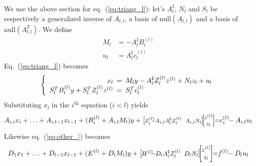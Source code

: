 \documentclass[]{article}
\theoremstyle{definition}
\newcommand{\BIN}{\begin{bmatrix}}
\newcommand{\BOUT}{\end{bmatrix}}
\begin{document}
We use the above section for eq.~(\ref{eq:triang_l}): let's $A_l^\sharp$, $N_l$ and $S_l$ be respectively a generalized inverse of $A_{l,l}$, a basis of $\mathrm{null}(A_{l,l})$ and a basis of $\mathrm{null}(A_{l,l}^T)$.
We define
\begin{align*}
	M_l &= -A_l^\sharp B_l^{(l)}\\
	u_l &= A_l^\sharp c_l^{(l)}
\end{align*}
Eq.~(\ref{eq:triang_l}) becomes
\begin{equation}
	\left\{ \begin{array}{rcl}
	x_l \hspace{-5pt}&=&\hspace{-5pt} M_l y -A_l^\sharp Z_l^{(l)} z^{(l)} + N_l z_l + u_l \\
	S_l^T B_l^{(l)} y + S_l^T Z_l^{(l)} z^{(l)} \hspace{-5pt}&=&\hspace{-5pt} S_l^T c_l^{(l)}
	\end{array}\right.
\end{equation}
Substituting $x_l$ in the $i^{\mathrm{th}}$ equation ($i<l$) yields
\begin{equation*}
\footnotesize
  A_{i,i} x_i + \ldots + A_{i,l-1} x_{l-1} + (B_i^{(l)} + A_{i,l} M_l)y 
	+ \BIN\hspace{-1pt} Z_i^{(l)} \hspace{-7pt}-\hspace{-3pt} A_{i,l} A_l^\sharp Z_l^{(l)} &\hspace{-5pt} A_{i,l} N_l\hspace{-1pt}\BOUT\hspace{-5pt} \BIN \hspace{-1pt}z^{(l)}\hspace{-1pt} \\ z_l \BOUT \hspace{-4pt}
	= \hspace{-3pt} c_i^{(l)} \hspace{-3pt}- A_{i,l} u_l
\end{equation*}
Likewise eq.~(\ref{eq:other_}) becomes
\begin{equation*}
\small
  D_1 x_ 1+ \ldots + D_{l-1} x_{l-1} + (E^{(l)} + D_l M_l)y 
	+ \BIN\hspace{-1pt} H^{(l)} \hspace{-5pt}-\hspace{-3pt} D_l A_l^\sharp Z_l^{(l)} &\hspace{-5pt} D_l N_l\hspace{-1pt}\BOUT\hspace{-5pt} \BIN \hspace{-1pt}z^{(l)}\hspace{-1pt} \\ z_l \BOUT \hspace{-4pt}
	= \hspace{-3pt} f^{(l)} \hspace{-3pt}- D_l u_l
\end{equation*}
\end{document}
